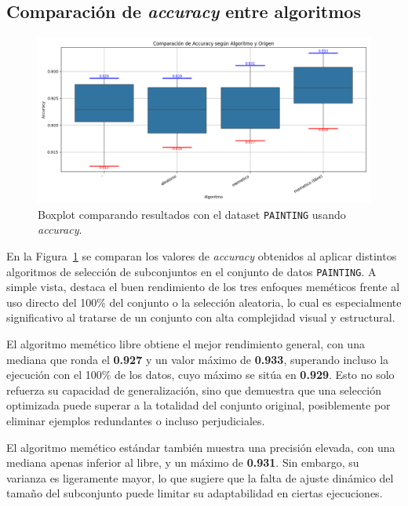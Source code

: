 \subsection{Comparación de \textit{accuracy} entre algoritmos}
\begin{figure}[htp]
    \centering
    \includegraphics[width=1\textwidth]{imagenes/evaluaciones/painting/comparacion-por-algoritmo}
    \caption{Boxplot comparando resultados con el dataset \texttt{PAINTING} usando \textit{accuracy}.}
    \label{fig:comparacion-por-algoritmo}
\end{figure}

En la Figura~\ref{fig:comparacion-por-algoritmo} se comparan los valores de \textit{accuracy} obtenidos al aplicar distintos
algoritmos de selección de subconjuntos en el conjunto de datos \texttt{PAINTING}.
A simple vista, destaca el buen rendimiento de los tres enfoques meméticos frente al uso directo del 100\% del conjunto o la selección aleatoria,
lo cual es especialmente significativo al tratarse de un conjunto con alta complejidad visual y estructural.

El algoritmo memético libre obtiene el mejor rendimiento general, con una mediana que ronda el \textbf{0.927} y un valor máximo de \textbf{0.933},
superando incluso la ejecución con el 100\% de los datos, cuyo máximo se sitúa en \textbf{0.929}.
Esto no solo refuerza su capacidad de generalización, sino que demuestra que una selección optimizada puede superar a la totalidad del conjunto original,
posiblemente por eliminar ejemplos redundantes o incluso perjudiciales.

El algoritmo memético estándar también muestra una precisión elevada, con una mediana apenas inferior al libre, y un máximo de \textbf{0.931}.
Sin embargo, su varianza es ligeramente mayor, lo que sugiere que la falta de ajuste dinámico del tamaño del subconjunto puede limitar su adaptabilidad en ciertas ejecuciones.

